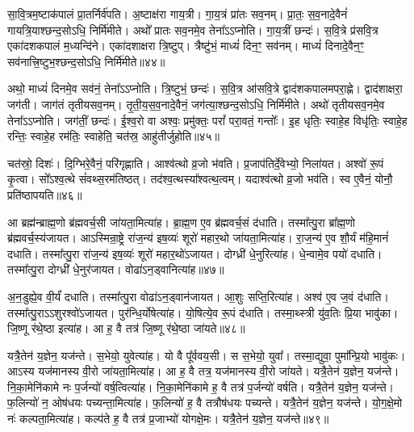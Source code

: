 सा॒वि॒त्रम॒ष्टा\-क॑पालं प्रा॒तर्निर्व॑पति।
अ॒ष्टाक्ष॑रा गाय॒त्री।
गा॒य॒त्रं प्रा॑तः सव॒नम्।
प्रा॒तः॒ स॒व॒नादे॒वैनं॑ गायत्रि॒याश्छन्द॒सो\-ऽधि॒ निर्मि॑मीते।
अथो᳚ प्रातः सव॒नमे॒व तेना᳚ऽऽप्नोति।
गा॒य॒त्रीं छन्दः॑।
स॒वि॒त्रे प्र॑सवि॒त्र एका॑\-दश\-कपालं म॒ध्यन्दि॑ने।
एका॑दशाक्षरा त्रि॒ष्टुप्।
त्रैष्टु॑भं॒ माध्यं॑ दिन॒ꣳ॒ सव॑नम्।
माध्यं॑ दिनादे॒वैन॒ꣳ॒ सव॑नात्त्रि॒ष्टुभ॒श्छन्द॒सोऽधि॒ निर्मि॑मीते॥४४॥

अथो॒ माध्यं॑ दिनमे॒व सव॑नं॒ तेना᳚ऽऽप्नोति।
त्रि॒ष्टुभं॒ छन्दः॑।
स॒वि॒त्र आ॑सवि॒त्रे द्वाद॑शकपालमपरा॒ह्णे।
द्वाद॑शाक्षरा॒ जग॑ती।
जाग॑तं तृतीयसव॒नम्।
तृ॒ती॒य॒स॒व॒नादे॒वैनं॒ जग॑त्या॒श्छन्द॒सोऽधि॒ निर्मि॑मीते।
अथो॑ तृतीयसव॒नमे॒व तेना᳚ऽऽप्नोति।
जग॑तीं॒ छन्दः॑।
ई॒श्व॒रो वा अश्वः॒ प्रमु॑क्तः॒ परां᳚ परा॒वतं॒ गन्तोः᳚।
इ॒ह धृतिः॒ स्वाहे॒ह विधृ॑तिः॒ स्वाहे॒ह रन्तिः॒ स्वाहे॒ह रम॑तिः॒ स्वाहेति॒ चत॑स्र॒ आहु॑तीर्जुहोति॥४५॥

चत॑स्रो॒ दिशः॑।
दि॒ग्भिरे॒वैनं॒ परि॑गृह्णाति।
आश्व॑त्थो व्र॒जो भ॑वति।
प्र॒जा\-प॑तिर्दे॒वेभ्यो॒ निला॑यत।
अश्वो॑ रू॒पं कृ॒त्वा।
सो᳚ऽश्व॒त्थे सं॑वथ्स॒रम॑तिष्ठत्।
तद॑श्व॒त्थस्या᳚श्वत्थ॒त्वम्।
यदाश्व॑त्थो व्र॒जो भव॑ति।
स्व ए॒वैनं॒ योनौ॒ प्रति॑\-ष्ठापयति॥४६॥\anuvakamend[त्रि॒ष्टुभ॒श्छन्द॒सोऽधि॒ निर्मि॑मीते जुहोति॒ नव॑ च]

आ ब्रह्म॑न्ब्राह्म॒णो ब्र॑ह्म\-वर्च॒सी जा॑यता॒मित्या॑ह।
ब्रा॒ह्म॒ण ए॒व ब्र॑ह्म\-वर्च॒सं द॑धाति।
तस्मा᳚त्पु॒रा ब्रा᳚ह्म॒णो ब्र॑ह्म\-वर्च॒स्य॑जायत।
आऽस्मिन्रा॒ष्ट्रे रा॑ज॒न्य॑ इष॒व्यः॑ शूरो॑ महार॒थो जा॑यता॒मित्या॑ह।
रा॒ज॒न्य॑ ए॒व शौ॒र्यं म॑हि॒मानं॑ दधाति।
तस्मा᳚त्पु॒रा रा॑ज॒न्य॑ इष॒व्यः॑ शूरो॑ महार॒थो॑\-ऽजायत।
दोग्ध्री॑ धे॒नुरित्या॑ह।
धे॒न्वामे॒व पयो॑ दधाति।
तस्मा᳚त्पु॒रा दोग्ध्री॑ धे॒नुर॑जायत।
वोढा॑\-ऽन॒ड्वानित्या॑ह॥४७॥

अ॒न॒डुह्ये॒व वी॒र्यं॑ दधाति।
तस्मा᳚त्पु॒रा वोढा॑\-ऽन॒ड्वान॑जायत।
आ॒शुः सप्ति॒रित्या॑ह।
अश्व॑ ए॒व ज॒वं द॑धाति।
तस्मा᳚त्पु॒रा\-ऽऽशुरश्वो॑\-ऽजायत।
पुर॑न्धि॒र्योषेत्या॑ह।
यो॒षित्ये॒व रू॒पं द॑धाति।
तस्मा॒थ्स्त्री यु॑व॒तिः प्रि॒या भावु॑का।
जि॒ष्णू र॑थे॒ष्ठा इत्या॑ह।
आ ह॒ वै तत्र॑ जि॒ष्णू र॑थे॒ष्ठा जा॑यते॥४८॥

यत्रै॒तेन॑ य॒ज्ञेन॒ यज॑न्ते।
स॒भेयो॒ युवेत्या॑ह।
यो वै पू᳚र्ववय॒सी।
स स॒भेयो॒ युवा᳚।
तस्मा॒द्युवा॒ पुमा᳚न्प्रि॒यो भावु॑कः।
आऽस्य यज॑मानस्य वी॒रो जा॑यता॒मित्या॑ह।
आ ह॒ वै तत्र॒ यज॑मानस्य वी॒रो जा॑यते।
यत्रै॒तेन॑ य॒ज्ञेन॒ यज॑न्ते।
नि॒का॒मेनि॑कामे नः प॒र्जन्यो॑ वर्\mbox{}ष॒त्वित्या॑ह।
नि॒का॒मेनि॑कामे ह॒ वै तत्र॑ प॒र्जन्यो॑ वर्\mbox{}षति।
यत्रै॒तेन॑ य॒ज्ञेन॒ यज॑न्ते।
फ॒लिन्यो॑ न॒ ओष॑धयः पच्यन्ता॒मित्या॑ह।
फ॒लिन्यो॑ ह॒ वै तत्रौष॑धयः पच्यन्ते।
यत्रै॒तेन॑ य॒ज्ञेन॒ यज॑न्ते।
यो॒ग॒क्षे॒मो नः॑ कल्पता॒मित्या॑ह।
कल्प॑ते ह॒ वै तत्र॑ प्र॒जाभ्यो॑ योगक्षे॒मः।
यत्रै॒तेन॑ य॒ज्ञेन॒ यज॑न्ते॥४९॥\anuvakamend[अ॒न॒ड्वानित्या॑ह जायते वर्‌\mbox{}षति स॒प्त च॑]

